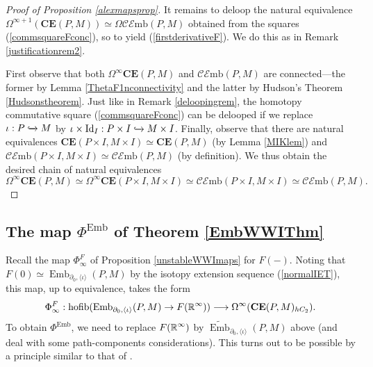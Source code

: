 \documentclass[a4paper, oneside]{amsart}
\newcommand{\emb}{\operatorname{Emb}}
\newcommand{\bemb}{\widetilde{\operatorname{Emb}}}
\newcommand{\hofib}{\operatorname{hofib}}
\newcommand{\Id}{\mathrm{Id}}
\newcommand{\1}{\mathds{1}}
\theoremstyle{remark}
\theoremstyle{definition}
\newcommand{\R}{{\scaleobj{0.97}{\mathbb{R}}}}
\newcommand{\CEsp}{\mathbf{CE}}
\numberwithin{equation}{section}
\begin{document}
\begin{proof}[Proof of Proposition \ref{alexmapsprop}]
It remains to deloop the natural equivalence $\Omega^{\infty+1}(\CEsp(P,M))\simeq \Omega\mathcal{CE}\mathrm{mb}(P,M)$ obtained from the squares (\ref{commsquareFconc}), so to yield (\ref{firstderivativeF}). We do this as in Remark \ref{justificationrem2}.  

First observe that both $\Omega^\infty\CEsp(P,M)$ and $\mathcal{CE}\mathrm{mb}(P,M)$ are connected---the former by Lemma \ref{ThetaF1nconnectivity} and the latter by Hudson's Theorem \ref{Hudsonstheorem}. Just like in Remark \ref{deloopingrem}, the homotopy commutative square (\ref{commsquareFconc}) can be delooped if we replace $\iota:P\xhookrightarrow{}M$ by $\iota\times\Id_{I}:P\times I\xhookrightarrow{}M\times I$. Finally, observe that there are natural equivalences $\CEsp(P\times I,M\times I)\simeq \CEsp(P,M)$ (by Lemma \ref{MIKlem}) and $\mathcal{CE}\mathrm{mb}(P\times I,M\times I)\simeq \mathcal{CE}\mathrm{mb}(P,M)$ (by definition). We thus obtain the desired chain of natural equivalences
$$
\Omega^\infty\CEsp(P,M)\simeq \Omega^\infty\CEsp(P\times I,M\times I)\simeq \mathcal{CE}\mathrm{mb}(P\times I,M\times I)\simeq \mathcal{CE}\mathrm{mb}(P,M).
$$
\end{proof}







\subsection{The map $\Phi^{\emb}$ of Theorem \ref{EmbWWIThm}}\label{ThmAproofsubsection} Recall the map $\Phi^F_\infty$ of Proposition \ref{unstableWWImaps} for $F(-)$. Noting that $F(0)\simeq \emb_{\partial_0,\langle\iota\rangle}(P,M)$ by the isotopy extension sequence (\ref{normalIET}), this map, up to equivalence, takes the form
$$
\Phi^F_\infty: \hofib(\emb_{\partial_0,\langle\iota\rangle}(P,M)\to F(\R^\infty))\longrightarrow \Omega^\infty(\CEsp(P,M)_{hC_2}).
$$
To obtain $\Phi^{\emb}$, we need to replace $F(\R^\infty)$ by $\bemb_{\partial_0,\langle\iota\rangle}(P,M)$ above (and deal with some path-components considerations). This turns out to be possible by a principle similar to that of \cite[Rem. 3.5]{WWI}.
\end{document}
